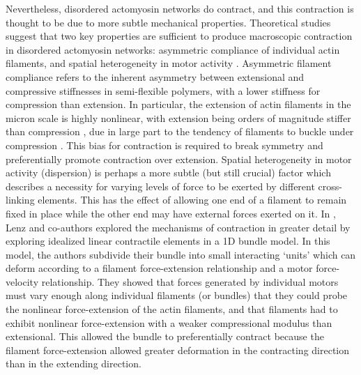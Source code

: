 Nevertheless, disordered actomyosin networks do contract, and this contraction is thought to be due to more subtle mechanical properties.  Theoretical studies suggest that two key properties are sufficient to produce macroscopic contraction in disordered actomyosin networks: asymmetric compliance of individual actin filaments, and spatial heterogeneity in motor activity \cite{1367-2630-14-3-033037,PhysRevX.4.041002}.   Asymmetric filament compliance refers to the inherent asymmetry between extensional and compressive stiffnesses in semi-flexible polymers, with a lower stiffness for compression than extension.  In particular, the extension of actin filaments in the micron scale is highly nonlinear, with extension being orders of magnitude stiffer than compression \cite{megareview}, due in large part to the tendency of filaments to buckle under compression \cite{PhysRevLett.108.238107}.  This bias for contraction is required to break symmetry and preferentially promote contraction over extension.  Spatial heterogeneity in motor activity (dispersion) is perhaps a more subtle (but still crucial) factor which describes a necessity for varying levels of force to be exerted by different cross-linking elements. This has the effect of allowing one end of a filament to remain fixed in place while the other end may have external forces exerted on it.  In \cite{1367-2630-14-3-033037}, Lenz and co-authors explored the mechanisms of contraction in greater detail by exploring idealized linear contractile elements in a 1D bundle model.  In this model, the authors subdivide their bundle into small interacting ‘units' which can deform according to a filament force-extension relationship and a motor force-velocity relationship. They showed that forces generated by individual motors must  vary enough along individual filaments (or bundles) that they could probe the nonlinear force-extension of the actin filaments, and that filaments had to exhibit nonlinear force-extension with a weaker compressional modulus than extensional.  This allowed the bundle to preferentially contract because the filament force-extension allowed greater deformation in the contracting direction than in the extending direction.

